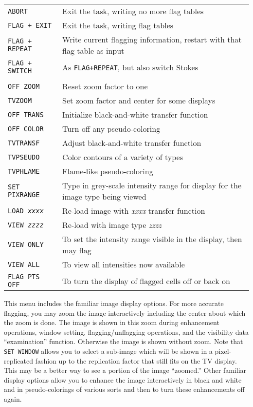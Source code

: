 \documentclass[twoside]{article}
\begin{document}
\begin{center}
\begin{tabular}{|l|l|}\hline
 {\tt ABORT          } & Exit the task, writing no more flag tables \\
 {\tt FLAG + EXIT    } & Exit the task, writing flag tables \\
 {\tt FLAG + REPEAT  } & Write current flagging information, restart
                         with that flag table as input \\
 {\tt FLAG + SWITCH  } & As {\tt FLAG+REPEAT}, but also switch Stokes \\
 {\tt                } & \\
 {\tt OFF ZOOM       } & Reset zoom factor to one \\
 {\tt TVZOOM         } & Set zoom factor and center for some displays \\
 {\tt OFF TRANS      } & Initialize black-and-white transfer function \\
 {\tt OFF COLOR      } & Turn off any pseudo-coloring \\
 {\tt TVTRANSF       } & Adjust black-and-white transfer function \\
 {\tt TVPSEUDO       } & Color contours of a variety of types \\
 {\tt TVPHLAME       } & Flame-like pseudo-coloring \\
 {\tt SET PIXRANGE   } & Type in grey-scale intensity range for
                         display for the image type being viewed\\
 {\tt LOAD {\it xxxx}} & Re-load image with {\it xxxx} transfer
                         function \\
 {\tt VIEW {\it zzzz}} & Re-load with image type {\it zzzz} \\
 {\tt VIEW ONLY      } & To set the intensity range visible in the
                         display, then may flag \\
 {\tt VIEW ALL       } & To view all intensities now available \\
 {\tt FLAG PTS OFF   } & To turn the display of flagged cells off or
                         back on\\
\hline
\end{tabular}
\end{center}

This menu includes the familiar image display options.  For more
accurate flagging, you may zoom the image interactively including the
center about which the zoom is done.  The image is shown in this zoom
during enhancement operations, window setting, flagging/unflagging
operations, and the visibility data ``examination'' function.
Otherwise the image is shown without zoom.  Note that {\tt SET WINDOW}
allows you to select a sub-image which will be shown in a
pixel-replicated fashion up to the replication factor that still fits
on the TV display.  This may be a better way to see a portion of the
image ``zoomed.''  Other familiar display options allow you to enhance
the image interactively in black and white and in pseudo-colorings of
various sorts and then to turn these enhancements off again.
\end{document}
